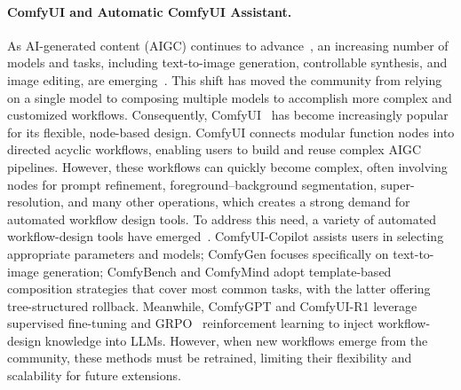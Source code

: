 \documentclass[runningheads]{llncs}
\begin{document}
\paragraph{ComfyUI and Automatic ComfyUI Assistant.}
As AI-generated content (AIGC) continues to advance~\cite{NEURIPS2020_4c5bcfec_diffusion,NEURIPS2021_49ad23d1_diffusion}, an increasing number of models and tasks, including text-to-image generation, controllable synthesis, and image editing, are emerging~\cite{kumari2023multi,ruiz2023dreambooth, li2023dreamedit, zhang2023adding}. This shift has moved the community from relying on a single model to composing multiple models to accomplish more complex and customized workflows. Consequently, ComfyUI~\cite{comfyanonymous2023comfyui} has become increasingly popular for its flexible, node-based design. ComfyUI connects modular function nodes into directed acyclic workflows, enabling users to build and reuse complex AIGC pipelines. However, these workflows can quickly become complex, often involving nodes for prompt refinement, foreground–background segmentation, super-resolution, and many other operations, which creates a strong demand for automated workflow design tools.
To address this need, a variety of automated workflow-design tools have emerged~\cite{gal2024comfygen,xu2025comfyuicopilot,sobania2024comfygi,chen2025symbolic,huang2025comfygpt,xu2025comfyuir1,xue2025comfybench,guo2025comfymind}. ComfyUI-Copilot\cite{xu2025comfyuicopilot} assists users in selecting appropriate parameters and models; ComfyGen\cite{gal2024comfygen} focuses specifically on text-to-image generation; ComfyBench\cite{xue2025comfybench} and ComfyMind\cite{guo2025comfymind} adopt template-based composition strategies that cover most common tasks, with the latter offering tree-structured rollback. Meanwhile, ComfyGPT\cite{huang2025comfygpt} and ComfyUI-R1\cite{xu2025comfyuir1} leverage supervised fine-tuning and GRPO~\cite{shao2024deepseekmath} reinforcement learning to inject workflow-design knowledge into LLMs. However, when new workflows emerge from the community, these methods must be retrained, limiting their flexibility and scalability for future extensions.
\end{document}
